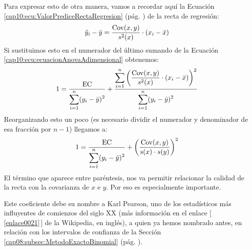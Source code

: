 Para expresar esto de otra manera, vamos a recordar aquí la Ecuación \ref{cap10:ecu:ValorPrediceRectaRegresion} (pág. \pageref{cap10:ecu:ValorPrediceRectaRegresion}) de la recta de regresión:
\[\hat y_i-\bar y = \dfrac{\mathrm{Cov}(x,y)}{s^2(x)}\cdot (x_i-\bar x)\]
Si sustituimos esto en el numerador del último sumando de la Ecuación \ref{cap10:ecu:ecuacionAnovaAdimensional} obtenemos:
\[1 =
\dfrac{\mbox{EC}}{\displaystyle\sum_{i=1}^{n}(y_i-\bar y)^2}
+
\dfrac{\displaystyle\sum_{i=1}^n\left(\dfrac{\mathrm{Cov}(x,y)}{s^2(x)}\cdot (x_i-\bar x) \right)^2}{\displaystyle\sum_{i=1}^{n}(y_i-\bar y)^2}
\]
Reorganizando esto un poco (es necesario dividir el numerador y denominador de esa fracción por
$n-1$) llegamos a:
\begin{equation}%
1 = \dfrac{\mbox{EC}}{\displaystyle\sum_{i=1}^{n}(y_i-\bar y)^2} + \left(
\dfrac{\Cov(x,y)}{s(x)\cdot s(y)} \right)^2
\end{equation}
El término que aparece entre paréntesis, nos va permitir relacionar la calidad de la recta con la covarianza de $x$ e $y$. Por eso es especialmente importante.
    \begin{center}
    \end{center}
Este coeficiente debe su nombre a Karl Pearson, uno de los estadísticos más influyentes de
comienzos del siglo XX (más información en el enlace [\,\ref{enlace0021}\,]\label{enlace0021a} de la Wikipedia, en inglés), a quien ya hemos nombrado antes, en relación con los intervalos de confianza de la Sección \ref{cap08:subsec:MetodoExactoBinomial} (pág. \pageref{cap08:subsec:MetodoExactoBinomial}).

